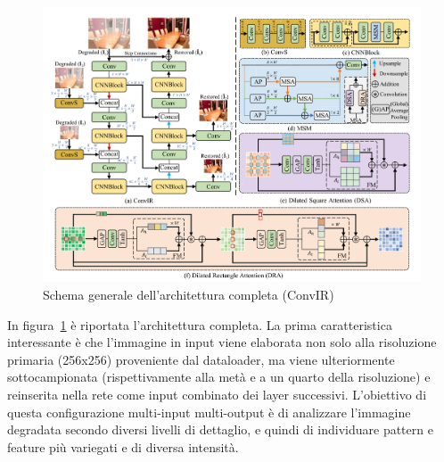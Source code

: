 \documentclass[a4paper,10pt,twocolumn]{article}
\begin{document}
\begin{figure}[t]
  \centering
  \includegraphics[width=\linewidth]{figures/architecture_complete.png}
  \caption{Schema generale dell'architettura completa (ConvIR)}
  \label{fig:architecture}
\end{figure}

In figura~\ref{fig:architecture} è riportata l'architettura completa. La prima caratteristica interessante è che l'immagine in input viene elaborata non solo alla risoluzione primaria (256x256)
proveniente dal dataloader, ma viene ulteriormente sottocampionata (rispettivamente alla metà e a un quarto della risoluzione) e reinserita nella rete come input combinato dei layer successivi.
L'obiettivo di questa configurazione multi-input multi-output è di analizzare l'immagine degradata secondo diversi livelli di dettaglio, e quindi di individuare pattern e feature più variegati e di diversa intensità.
\end{document}
